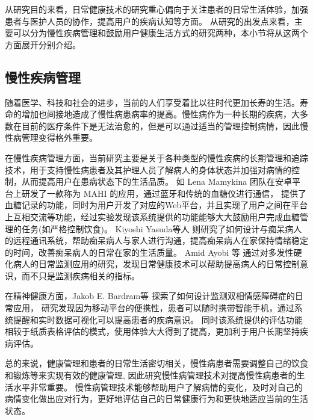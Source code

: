 从研究目的来看，日常健康技术的研究重心偏向于关注患者的日常生活体验，加强患者与医护人员的协作，提高用户的疾病认知等方面\cite{nunes2015self-care}。
从研究的出发点来看，主要可以分为慢性疾病管理和鼓励用户健康生活方式的研究两种\cite{nunes2015self-care}，本小节将从这两个方面展开分别介绍。

\subsection{慢性疾病管理}
随着医学、科技和社会的进步，当前的人们享受着比以往时代更加长寿的生活\cite{OlshanskyDEMOGRAPHY}。寿命的增加也间接地造成了慢性病患病率的提高\cite{kaye2006overview}。慢性病作为一种长期的疾病，大多数在目前的医疗条件下是无法治愈的，但是可以通过适当的管理控制病情，因此慢性病管理变得格外重要\cite{Ben2002A}。

在慢性疾病管理方面，当前研究主要是关于各种类型的慢性疾病的长期管理和追踪技术，用于支持慢性病患者及其护理人员了解病人的身体状态并加强对病情的控制，从而提高用户在患病状态下的生活品质。
如 Lena Mamykina \cite{mamykina2008mahi:}团队在安卓平台上研发了一款称为 MAHI 的应用，通过蓝牙和传统的血糖仪进行通信，
提供了血糖记录的功能，同时为用户开发了对应的Web平台，并且实现了用户之间在平台上互相交流等功能，经过实验发现该系统提供的功能能够大大鼓励用户完成血糖管理的任务(如严格控制饮食)。
Kiyoshi Yasuda等人 \cite{yasuda2009remote}则研究了如何设计与痴呆病人的远程通讯系统，帮助痴呆病人与家人进行沟通，提高痴呆病人在家保持情绪稳定的时间，改善痴呆病人的日常在家的生活质量。
Amid Ayobi 等\cite{ayobi2017quantifying} 通过对多发性硬化病人的日常监测应用的研究，发现日常健康技术可以帮助提高病人的日常控制意识，而不只是监测疾病相关的指标。

在精神健康方面，Jakob E. Bardram等 \cite{bardram2013designing}探索了如何设计监测双相情感障碍症的日常应用， 研究发现因为移动平台的便携性，患者可以随时携带智能手机，通过系统提醒和实时数据可视化可以提高患者的疾病意识。
同时该系统提供的评估功能相较于纸质表格评估的模式，使用体验大大得到了提高，更加利于用户长期坚持疾病评估。

总的来说，健康管理和患者的日常生活密切相关，慢性病患者需要调整自己的饮食和锻炼等来实现有效的健康管理\cite{nunes2018understanding}, 因此研究慢性病管理技术对提高慢性病患者的生活水平非常重要。
慢性病管理技术能够帮助用户了解病情的变化，及时对自己的病情变化做出应对行为，更好地评估自己的日常健康行为和更快地适应当前的生活状态\cite{ayobi2017quantifying}。


